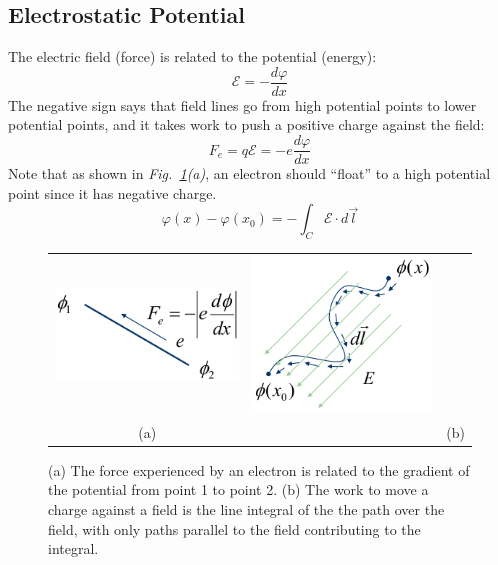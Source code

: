 \subsection{Electrostatic Potential}
The electric field (force) is related to the potential (energy):
    \begin{equation} 
        \mathcal{E} =  - \frac{{d\varphi }}{{dx}} 
    \end{equation}
The negative sign says that field lines go from high potential points to lower potential points, and it takes work to push a positive charge against the field:
    \begin{equation} 
        {F_e} = q\mathcal{E} =  - e\frac{{d\varphi }}{{dx}} 
    \end{equation}
Note that as shown in \emph{Fig.~\ref{fig:mod2-2_ICtech_sld_14}(a)}, an electron should “float” to a high potential point since it has negative charge.   
    \begin{equation} 
        \varphi (x) - \varphi ({x_0}) =  - \int_C {\mathcal{E} \cdot d\vec l} 
    \end{equation}
\begin{figure}[H]
\centering
\begin{tabular}{ccc}
\includegraphics[width=.25\columnwidth]{mod2-2_ICtech_sld_14} &
\hspace{3cm}
\includegraphics[width=.3\columnwidth]{mod2-2_ICtech_sld_15}\\
(a) & & (b)\\
\end{tabular}
\caption{(a)  The force experienced by an electron is related to the gradient of the potential from point 1 to point 2.  (b)  The work to move a charge against a field is the line integral of the the path over the field, with only paths parallel to the field contributing to the integral.}
\label{fig:mod2-2_ICtech_sld_14}
\end{figure}
